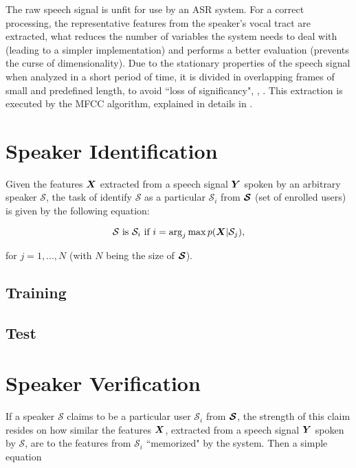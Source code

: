 The raw speech signal is unfit for use by an ASR system. For a correct processing, the representative features from the speaker's vocal tract are extracted, what reduces the number of variables the system needs to deal with (leading to a simpler implementation) and performs a better evaluation (prevents the curse of dimensionality). Due to the stationary properties of the speech signal when analyzed in a short period of time, it is divided in overlapping frames of small and predefined length, to avoid ``loss of significancy", , . This extraction is executed by the MFCC algorithm, explained in details in .

\section{Speaker Identification}
\label{sec:speaker-identification}

Given the features $\boldsymbol{X}$ extracted from a speech signal $\boldsymbol{Y}$ spoken by an arbitrary speaker $\mathcal{S}$, the task of identify $\mathcal{S}$ as a particular $\mathcal{S}_i$ from $\boldsymbol{\mathcal{S}}$ (set of enrolled users) is given by the following equation:

\begin{equation}
    \mathcal{S} \text{ is } \mathcal{S}_i \text{ if } i = \arg_j\max\postpdf{\boldsymbol{X}}{\mathcal{S}_j},
    \label{eq:classification_speaker_identification}
\end{equation}

\noindent for $j = 1, ..., N$ (with $N$ being the size of $\boldsymbol{\mathcal{S}}$).

\subsection{Training}

\subsection{Test}

\section{Speaker Verification}
\label{sec:speaker-verification}

If a speaker $\mathcal{S}$ claims to be a particular user $\mathcal{S}_i$ from $\boldsymbol{\mathcal{S}}$, the strength of this claim resides on how similar the features $\boldsymbol{X}$, extracted from a speech signal $\boldsymbol{Y}$ spoken by $\mathcal{S}$, are to the features from $\mathcal{S}_i$ ``memorized" by the system. Then a simple equation

